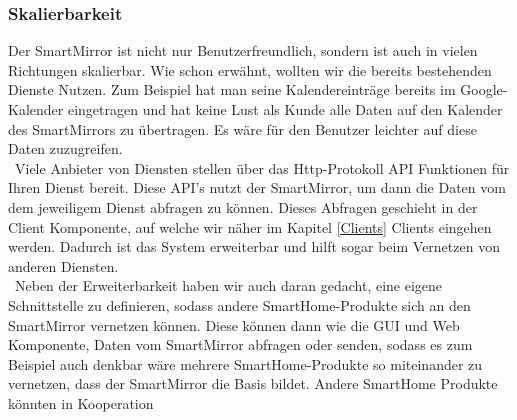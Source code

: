 \subsubsection{Skalierbarkeit}\label{Skalierbarkeit}
Der SmartMirror ist nicht nur Benutzerfreundlich, sondern ist auch in vielen Richtungen skalierbar.
Wie schon erwähnt, wollten wir die bereits bestehenden Dienste Nutzen. Zum Beispiel hat man seine Kalendereinträge bereits im Google-Kalender eingetragen und hat keine Lust als Kunde alle Daten auf den Kalender des SmartMirrors zu übertragen. Es wäre für den Benutzer leichter auf diese Daten zuzugreifen. \\\
Viele Anbieter von Diensten stellen über das Http-Protokoll API Funktionen für Ihren Dienst bereit. Diese API's nutzt der SmartMirror, um dann die Daten vom dem jeweiligem Dienst abfragen zu können. Dieses Abfragen geschieht in der Client Komponente, auf welche wir näher im Kapitel \ref{Clients} Clients eingehen werden. Dadurch ist das System erweiterbar und hilft sogar beim Vernetzen von anderen Diensten.\\\
Neben der Erweiterbarkeit haben wir auch daran gedacht, eine eigene Schnittstelle zu definieren, sodass andere SmartHome-Produkte sich an den SmartMirror vernetzen können. Diese können dann wie die GUI und Web Komponente, Daten vom SmartMirror abfragen oder senden, sodass es zum Beispiel auch denkbar wäre mehrere SmartHome-Produkte so miteinander zu vernetzen, dass der SmartMirror die Basis bildet. Andere SmartHome Produkte könnten in Kooperation\\\




